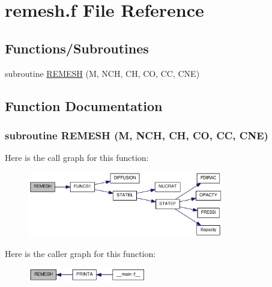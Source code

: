 \hypertarget{remesh_8f}{
\section{remesh.f File Reference}
\label{remesh_8f}
}
\subsection*{Functions/Subroutines}
\begin{DoxyCompactItemize}
\item 
subroutine \hyperlink{remesh_8f_a1b871c6b51d95396e725b7318e6ab885}{REMESH} (M, NCH, CH, CO, CC, CNE)
\end{DoxyCompactItemize}


\subsection{Function Documentation}
\hypertarget{remesh_8f_a1b871c6b51d95396e725b7318e6ab885}{
\subsubsection[{REMESH}]{\setlength{\rightskip}{0pt plus 5cm}subroutine REMESH (M, \/  NCH, \/  CH, \/  CO, \/  CC, \/  CNE)}}
\label{remesh_8f_a1b871c6b51d95396e725b7318e6ab885}


Here is the call graph for this function:\nopagebreak
\begin{figure}[H]
\begin{center}
\leavevmode
\includegraphics[width=242pt]{remesh_8f_a1b871c6b51d95396e725b7318e6ab885_cgraph}
\end{center}
\end{figure}


Here is the caller graph for this function:\nopagebreak
\begin{figure}[H]
\begin{center}
\leavevmode
\includegraphics[width=146pt]{remesh_8f_a1b871c6b51d95396e725b7318e6ab885_icgraph}
\end{center}
\end{figure}

